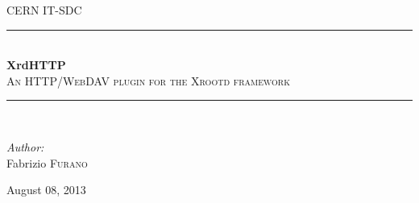 \documentclass[12pt]{article} %
\begin{document}
\setcounter{secnumdepth}{3}
\setcounter{tocdepth}{3}


\begin{titlepage}

\newcommand{\HRule}{\rule{\linewidth}{0.5mm}} %

\center %

\textsc{\LARGE CERN IT-SDC}\\[1.5cm] %

\HRule \\[0.4cm]
{ \huge \bfseries XrdHTTP}\\[0.4cm] %
\textsc{\Large An HTTP/WebDAV plugin for the Xrootd framework}\\[0.5cm]
\HRule \\[1.5cm]

\begin{minipage}{0.4\textwidth}
\begin{flushleft} \large
\emph{Author:}\\
Fabrizio \textsc{Furano} \\ %
\end{flushleft}
\end{minipage}


{\large August 08, 2013}\\[3cm] %


\vfill %

\end{titlepage}
\end{document}
